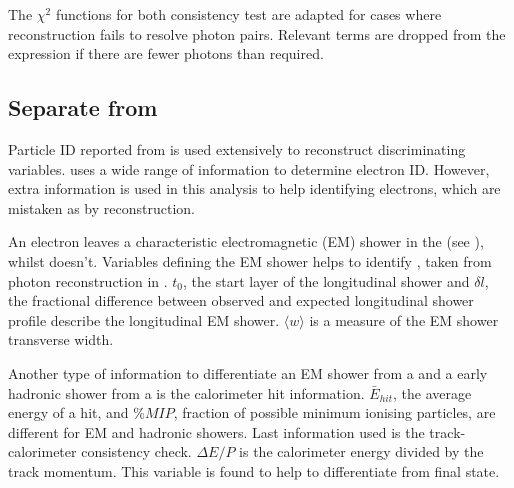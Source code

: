 The $\chi^{2}$ functions for both consistency test are adapted for cases where reconstruction fails to resolve photon pairs. Relevant terms are dropped from the expression if there are fewer photons than required.

\subsection{Separate \decayElectronShort from \decayPionShort}

Particle ID reported from \pandora is used extensively to reconstruct discriminating variables. \pandora uses a wide range of information to determine electron ID. However, extra information is used in this analysis to help identifying electrons, which are mistaken as \Pgpm by \pandora reconstruction.

An electron leaves a characteristic electromagnetic  (EM) shower in the \ECAL (see ), whilst \Pgpm doesn't. Variables defining the  EM shower helps to identify \Pem, taken from photon reconstruction in . $t_0$, the start layer of the longitudinal shower and $\delta{l}$, the fractional difference between observed and expected longitudinal shower profile describe the longitudinal EM shower. $\langle{w}\rangle$ is a measure of the EM shower transverse width.

Another type of information to differentiate an EM shower from a \Pem and a early hadronic shower from a \Pgpm is the calorimeter hit information. $\bar{E}_{hit}$, the average energy of a hit, and $\%MIP$, fraction of possible minimum ionising particles, are different for EM and hadronic showers. Last information used is the track-calorimeter consistency check. $\Delta E/P$ is the calorimeter energy divided by the track momentum. This variable is found to help to differentiate \decayElectronShort from \decayPionShort final state.



